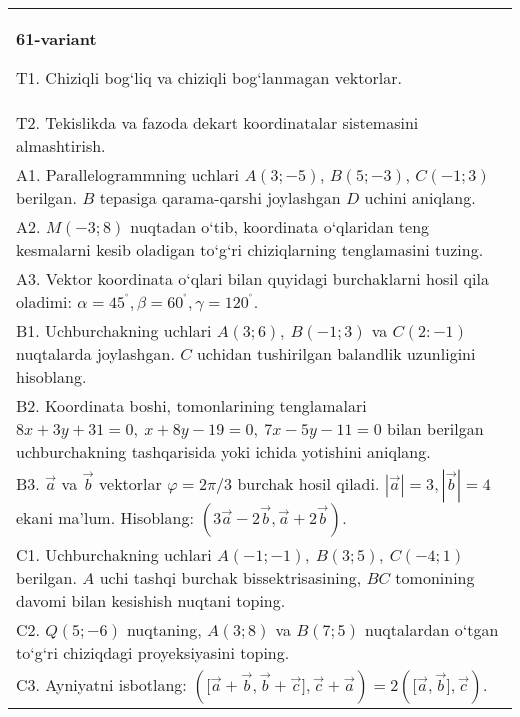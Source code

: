 \documentclass{article}
\begin{document}
\begin{tabular}{m{17cm}}
\textbf{61-variant}
\newline

T1. 
Chiziqli bog‘liq va chiziqli bog‘lanmagan vektorlar.
 \\
T2. Tekislikda va fazoda dekart koordinatalar sistemasini almashtirish.
 \\
A1. 
Parallelogrammning uchlari
$A (3;-5) $, $B (5;-3) $, $C (-1;3) $ berilgan. $B$ tepasiga
qarama-qarshi joylashgan $D$ uchini aniqlang.
 \\
A2. 
$M (-3;8) $ nuqtadan o‘tib, koordinata o‘qlaridan
teng kesmalarni kesib oladigan to‘g‘ri chiziqlarning tenglamasini tuzing.
 \\
A3. Vektor koordinata o‘qlari bilan quyidagi burchaklarni hosil qila oladimi:
$\alpha = 45^{{^\circ}},\beta = 60^{{^\circ}},\gamma = 120^{{^\circ}}$.
 \\
B1. 
Uchburchakning uchlari \(A (3;6),\ B (-1;3) \) va
\(C (2:-1) \) nuqtalarda joylashgan. $C$ uchidan tushirilgan balandlik uzunligini hisoblang.
 \\
B2. 
Koordinata boshi, tomonlarining tenglamalari
\(8x+3y+31=0,\ x+8y-19=0,\ 7x-5y-11=0\) bilan
berilgan uchburchakning tashqarisida yoki ichida yotishini aniqlang.
 \\
B3. 
$\vec{a}$ va $\vec{b}$ vektorlar $\varphi = 2\pi/3$ burchak hosil qiladi. $|\vec{a}| = 3,|\vec{b}| = 4$ ekani ma’lum. Hisoblang:
$\left(3\vec{a} - 2\vec{b},\vec{a} + 2\vec{b} \right) $.
 \\
C1. 
Uchburchakning uchlari
\(A (- 1; - 1),\ B (3;5),\ C (- 4;1) \) berilgan. $A$ uchi tashqi
burchak bissektrisasining, $BC$ tomonining davomi bilan kesishish
nuqtani toping.
 \\
C2. 
\(Q (5; - 6) \) nuqtaning, \(A (3;8) \) va \(B (7;5) \)
nuqtalardan o‘tgan to‘g‘ri chiziqdagi proyeksiyasini toping.
 \\
C3. 
Ayniyatni isbotlang: \((\lbrack\vec{a} + \vec{b},\vec{b} + \vec{c}\rbrack,\vec{c} + \vec{a}) = 2 (\lbrack\vec{a},\vec{b}\rbrack,\vec{c}) \).
 \\

\end{tabular}
\vspace{1cm}
\end{document}
